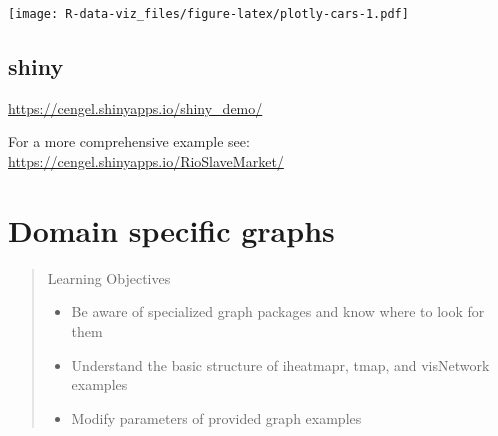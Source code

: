 \documentclass[]{book}
\newenvironment{Shaded}{\begin{snugshade}}{\end{snugshade}}
\newcommand{\KeywordTok}[1]{\textcolor[rgb]{0.13,0.29,0.53}{\textbf{#1}}}
\newcommand{\DataTypeTok}[1]{\textcolor[rgb]{0.13,0.29,0.53}{#1}}
\newcommand{\DecValTok}[1]{\textcolor[rgb]{0.00,0.00,0.81}{#1}}
\newcommand{\StringTok}[1]{\textcolor[rgb]{0.31,0.60,0.02}{#1}}
\newcommand{\OperatorTok}[1]{\textcolor[rgb]{0.81,0.36,0.00}{\textbf{#1}}}
\newcommand{\NormalTok}[1]{#1}
\providecommand{\tightlist}{%
  \setlength{\itemsep}{0pt}\setlength{\parskip}{0pt}}
\theoremstyle{definition}
\theoremstyle{definition}
\theoremstyle{definition}
\theoremstyle{remark}
\begin{document}
\texttt{[image: R-data-viz\_files/figure-latex/plotly-cars-1.pdf]}

\section{shiny}\label{shiny}

\url{https://cengel.shinyapps.io/shiny_demo/}

\begin{Shaded}
\end{Shaded}

For a more comprehensive example see:
\url{https://cengel.shinyapps.io/RioSlaveMarket/}

\chapter{Domain specific graphs}\label{domains}

\begin{quote}
Learning Objectives

\begin{itemize}
\tightlist
\item
  Be aware of specialized graph packages and know where to look for them
\item
  Understand the basic structure of iheatmapr, tmap, and visNetwork
  examples
\item
  Modify parameters of provided graph examples
\end{itemize}
\end{quote}
\end{document}
